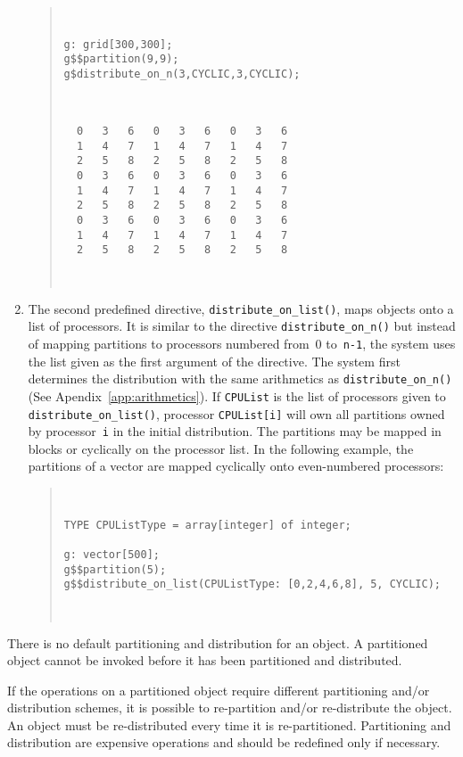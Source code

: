 \documentclass{article}
\newenvironment{example}
  {\begin{quote} ~\hrulefill }
  {~\hrulefill \end{quote} }
\begin{document}
\begin{enumerate}
\begin{example}
\begin{minipage}{3.5in}
\begin{verbatim}
g: grid[300,300];
g$$partition(9,9);
g$distribute_on_n(3,CYCLIC,3,CYCLIC);
\end{verbatim}
\end{minipage} \ \
\begin{minipage}{2.5in}
\begin{verbatim}
  0   3   6   0   3   6   0   3   6 
  1   4   7   1   4   7   1   4   7 
  2   5   8   2   5   8   2   5   8 
  0   3   6   0   3   6   0   3   6 
  1   4   7   1   4   7   1   4   7 
  2   5   8   2   5   8   2   5   8 
  0   3   6   0   3   6   0   3   6 
  1   4   7   1   4   7   1   4   7 
  2   5   8   2   5   8   2   5   8 
\end{verbatim}
\end{minipage}

\end{example}
\remark{$}

\item
The second predefined directive, \verb+distribute_on_list()+, maps
objects onto a list of processors. It is similar to the directive
\verb+distribute_on_n()+ but instead of mapping partitions to
processors numbered from~0 to~\verb+n-1+, the system uses the list
given as the first argument of the directive. The system first
determines the distribution with the same arithmetics as
\verb+distribute_on_n()+ (See Apendix~\ref{app:arithmetics}). If
\verb+CPUList+ is the list of processors given to
\verb+distribute_on_list()+, processor \verb+CPUList[i]+ will own all
partitions owned by processor~\verb+i+ in the initial
distribution. The partitions may be mapped in blocks or cyclically on
the processor list. In the following example, the partitions of a
vector are mapped cyclically onto even-numbered processors:


\begin{example} 
\begin{verbatim}
TYPE CPUListType = array[integer] of integer;

g: vector[500];
g$$partition(5);
g$$distribute_on_list(CPUListType: [0,2,4,6,8], 5, CYCLIC);
\end{verbatim} 
\end{example}

\end{enumerate}

There is no default partitioning and distribution for an object. A
partitioned object cannot be invoked before it has been partitioned
and distributed. 

If the operations on a partitioned object require different
partitioning and/or distribution schemes, it is possible to
re-partition and/or re-distribute the object. An object must be
re-distributed every time it is re-partitioned. Partitioning and
distribution are expensive operations and should be redefined only if
necessary.
\end{document}
